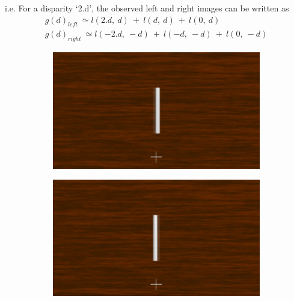i.e. For a disparity `2.d', the observed left and right images can be written as
\begin{equation}
\begin{aligned}
g(d)_{left} \: \simeq l(2.d,\:d)\:+\: l(d,\:d)\:+\:l(0,\:d) \\
g(d)_{right} \: \simeq l(-2.d,\:-d)\:+\: l(-d,\:-d)\:+\:l(0,\:-d)
\end{aligned}
\label{eq:auto_obs_imgs}
\end{equation}
\begin{figure}[htbp]
    \begin{subfigure}[b]{0.5\textwidth}
        \includegraphics[width=\textwidth]{./Template_Figures/stereo_ghost_left}
        \caption{}\label{fig:obs_st_left}
    \end{subfigure}
    \begin{subfigure}[b]{0.5\textwidth}
        \includegraphics[width=\textwidth]{./Template_Figures/stereo_ghost_right}
        \caption{}\label{fig:obs_st_right}
    \end{subfigure}


\end{figure}
